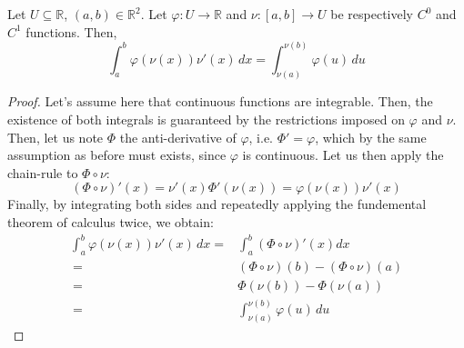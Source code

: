 \documentclass[solutions.tex]{subfiles}
\begin{document}
\begin{theorem}
Let $U \subseteq \mathbb{R}$, $(a, b)\in\mathbb{R}^2$. Let
$\varphi : U \rightarrow \mathbb{R}$ and $\nu : [a, b] \rightarrow U$
be respectively $C^0$ and $C^1$ functions. Then,
\[
	\boxed{\int_a^b\varphi(\nu(x))\nu'(x)\,dx = \int_{\nu(a)}^{\nu(b)}\varphi(u)\,du}
\]
\end{theorem}
\begin{proof}
Let's assume here that continuous functions are integrable. Then,
the existence of both integrals is guaranteed by
the restrictions imposed on $\varphi$ and $\nu$. \\

Then, let us note $\Phi$ the anti-derivative of $\varphi$, i.e.
$\Phi' = \varphi$, which by the same assumption as before must exists,
since $\varphi$ is continuous. Let us then apply the chain-rule to
$\Phi \circ \nu$:
\[
	(\Phi \circ \nu)'(x) = \nu'(x)\Phi'(\nu(x)) = \varphi(\nu(x))\nu'(x)
\]
Finally, by integrating both sides and repeatedly applying the fundemental
theorem of calculus twice, we obtain:
\begin{equation*} \begin{aligned}
	\int_a^b\varphi(\nu(x))\nu'(x)\,dx =& \int_a^b(\Phi \circ \nu)'(x)dx \\
	~ =& (\Phi \circ \nu)(b)-(\Phi \circ \nu)(a) \\
	~ =& \Phi(\nu(b)) - \Phi(\nu(a)) \\
	~ =& \int_{\nu(a)}^{\nu(b)}\varphi(u)\,du
\end{aligned} \end{equation*}
\end{proof}
\end{document}
